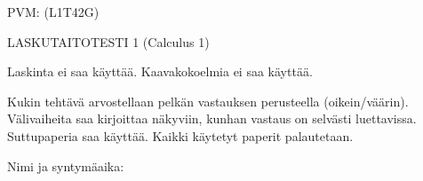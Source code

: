 \documentclass[finnish, a4paper, 12pt]{article}
\begin{document}
	
	
		PVM: \underline{\phantom{mm.mm.}}
		\hfill
		(L1T42G)	%
	
	\begin{center}
		{\large
			LASKUTAITOTESTI 1 (Calculus 1)}
	\end{center}
	
	Laskinta ei saa käyttää. Kaavakokoelmia ei saa käyttää.
	
	Kukin tehtävä arvostellaan pelkän vastauksen perusteella (oikein/väärin).
	Välivaiheita saa kirjoittaa näkyviin, kunhan vastaus on selvästi luettavissa.
	Suttupaperia saa käyttää. Kaikki käytetyt paperit palautetaan.
	
\vspace{12pt}
Nimi ja syntymäaika: \phantom{m} \hrulefill
\vspace{8pt}
	
\end{document}
